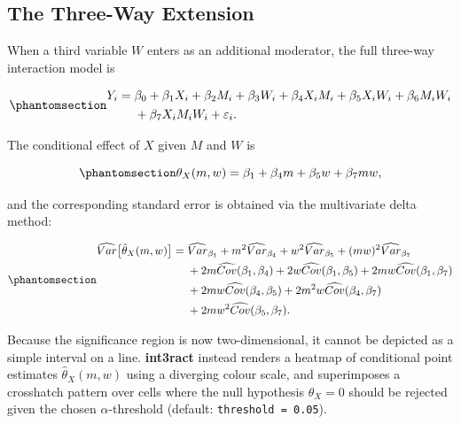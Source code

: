 \documentclass[
  letterpaper,
  DIV=11,
  numbers=noendperiod]{scrartcl}
\begin{document}
\subsection{The Three-Way Extension}\label{sec-threeway}

When a third variable \(W\) enters as an additional moderator, the full
three-way interaction model is

\begin{equation}\phantomsection\label{eq-3way}{
\begin{aligned}
Y_i = \; & \beta_0 + \beta_1 X_i + \beta_2 M_i + \beta_3 W_i
           + \beta_4 X_i M_i + \beta_5 X_i W_i + \beta_6 M_i W_i \\
         & + \beta_7 X_i M_i W_i + \varepsilon_i.
\end{aligned}
}\end{equation}

The conditional effect of \(X\) given \(M\) and \(W\) is

\begin{equation}\phantomsection\label{eq-theta3way}{
\theta_X(m, w)
  = \beta_1 + \beta_4 m + \beta_5 w + \beta_7 mw,
}\end{equation}

and the corresponding standard error is obtained via the multivariate
delta method:

\begin{equation}\phantomsection\label{eq-se3way}{
\begin{aligned}
\widehat{Var}\bigl[\hat{\theta}_X(m,w)\bigr]
  = \; & \widehat{Var}_{\beta_1}
      + m^2 \widehat{Var}_{\beta_4}
      + w^2 \widehat{Var}_{\beta_5}
      + (m w)^2 \widehat{Var}_{\beta_7} \\
    & + 2m \widehat{Cov}(\beta_1,\beta_4)
      + 2w \widehat{Cov}(\beta_1,\beta_5)
      + 2m w \widehat{Cov}(\beta_1,\beta_7) \\
    & + 2m w \widehat{Cov}(\beta_4,\beta_5)
      + 2m^2 w \widehat{Cov}(\beta_4,\beta_7) \\
    & + 2m w^2 \widehat{Cov}(\beta_5,\beta_7).
\end{aligned}
}\end{equation}

Because the significance region is now two-dimensional, it cannot be
depicted as a simple interval on a line. \textbf{int3ract} instead
renders a heatmap of conditional point estimates
\(\hat{\theta}_X(m, w)\) using a diverging colour scale, and
superimposes a crosshatch pattern over cells where the null hypothesis
\(\theta_X = 0\) should be rejected given the chosen
\(\alpha\)-threshold (default: \texttt{threshold\ =\ 0.05}).
\end{document}
